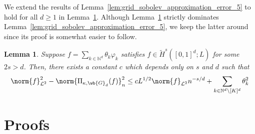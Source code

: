 \documentclass{article}
\newcommand{\1}{\mathbf{1}}
\newcommand{\Nbb}{\mathbb{N}}
\newcommand{\Leb}{\mathcal{L}}
\newcommand{\wt}[1]{\widetilde{#1}}
\theoremstyle{alden}
\theoremstyle{aldenthm}
\newtheorem{lemma}{Lemma}
\theoremstyle{definition}
\theoremstyle{remark}
\begin{document}
We extend the results of Lemma~\ref{lem:grid_sobolev_approximation_error_5} to hold for all $d \geq 1$ in Lemma~\ref{lem:grid_sobolev_approximation_error_6}. Although Lemma~\ref{lem:grid_sobolev_approximation_error_6} strictly dominates Lemma~\ref{lem:grid_sobolev_approximation_error_5}, we keep the latter around since its proof is somewhat easier to follow. 
\begin{lemma}
	\label{lem:grid_sobolev_approximation_error_6}
	Suppose $f = \sum_{k \in \Nbb^d} \theta_k \varphi_k$ satisfies $f \in \wt{H}^s([0,1]^d;L)$ for some $2s > d$. Then, there exists a constant $c$ which depends only on $s$ and $d$ such that
	\begin{equation}
	\label{eqn:grid_sobolev_approximation_error_6}
	\norm{f}_{\Leb^2}^2 - \norm{\Pi_{\kappa,\wb{G}_d}(f)}_{n}^2 \leq c L^{1/2} \norm{f}_{\Leb^2} n^{-s/d} + \sum_{k \in \Nbb^d \setminus [K]^d} \theta_k^2
	\end{equation}
\end{lemma}

\section{Proofs}
\end{document}
